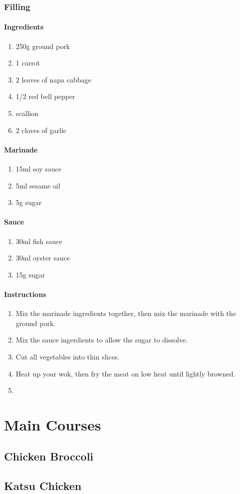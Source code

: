 \documentclass[11pt]{report}
\newcommand{\header}[1]{\subsubsection*{#1}}
\begin{document}
\subsection{Filling}
\header{Ingredients}
\begin{enumerate}
  \item 250g ground pork
  \item 1 carrot
  \item 2 leaves of napa cabbage
  \item 1/2 red bell pepper
  \item scallion
  \item 2 cloves of garlic
\end{enumerate}

\header{Marinade}
\begin{enumerate}
  \item 15ml soy sauce
  \item 5ml sesame oil
  \item 5g sugar
\end{enumerate}

\header{Sauce}
\begin{enumerate}
  \item 30ml fish sauce
  \item 30ml oyster sauce
  \item 15g sugar
\end{enumerate}

\header{Instructions}
\begin{enumerate}
  \item Mix the marinade ingredients together, then mix the marinade with the
  ground pork.
  \item Mix the sauce ingerdients to allow the sugar to dissolve.
  \item Cut all vegetables into thin slices.
  \item Heat up your wok, then fry the meat on low heat until lightly browned.
  \item
\end{enumerate}

\chapter{Main Courses}
\section{Chicken Broccoli}
\section{Katsu Chicken}
\end{document}
